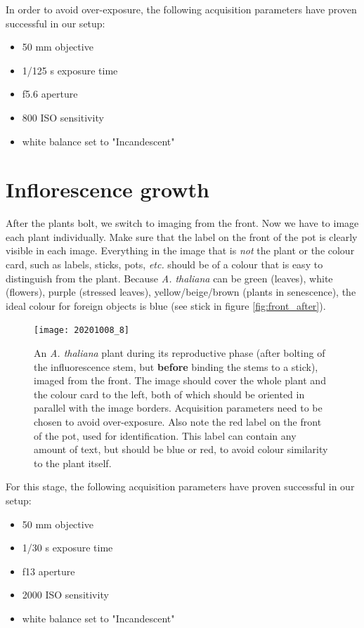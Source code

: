 \documentclass[10pt]{article}
\begin{document}
 	\noindent In order to avoid over-exposure, the following acquisition parameters have proven successful in our setup:
 
	 \begin{itemize}
	 	\item 50 mm objective
	 	\item 1/125 s exposure time
	 	\item f5.6 aperture
	 	\item 800 ISO sensitivity
	 	\item white balance set to "Incandescent"
	 \end{itemize}
 
 	\section{Inflorescence growth}
 	
 	After the plants bolt, we switch to imaging from the front. Now we have to image each plant individually. Make sure that the label on the front of the pot is clearly visible in each image. Everything in the image that is \textit{not} the plant or the colour card, such as labels, sticks, pots, \textit{etc.} should be of a colour that is easy to distinguish from the plant. Because \textit{A. thaliana} can be green (leaves), white (flowers), purple (stressed leaves), yellow/beige/brown (plants in senescence), the ideal colour for foreign objects is blue (see stick in figure \ref{fig:front_after}).
 	
 	\begin{figure}[!h]
 		\centering
 		\texttt{[image: 20201008\_8]}
 		\caption[Example image of a front-view image.]{An \textit{A. thaliana} plant during its reproductive phase (after bolting of the influorescence stem, but \textbf{before} binding the stems to a stick), imaged from the front. The image should cover the whole plant and the colour card to the left, both of which should be oriented in parallel with the image borders. Acquisition parameters need to be chosen to avoid over-exposure. Also note the red label on the front of the pot, used for identification. This label can contain any amount of text, but should be blue or red, to avoid colour similarity to the plant itself.}
 		\label{fig:front_before}
 	\end{figure}
 
 	\noindent For this stage, the following acquisition parameters have proven successful in our setup:
 	
 	\begin{itemize}
 		\item 50 mm objective
 		\item 1/30 s exposure time
 		\item f13 aperture
 		\item 2000 ISO sensitivity
 		\item white balance set to "Incandescent"
 	\end{itemize}
 
\end{document}
